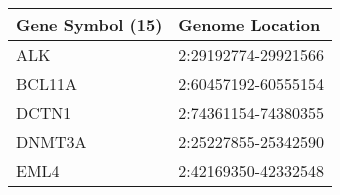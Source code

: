 \begin{tabular}{ll}
\toprule
Gene Symbol (15) &     Genome Location \\
\midrule
             ALK & 2:29192774-29921566 \\
          BCL11A & 2:60457192-60555154 \\
           DCTN1 & 2:74361154-74380355 \\
          DNMT3A & 2:25227855-25342590 \\
            EML4 & 2:42169350-42332548 \\
\bottomrule
\end{tabular}
